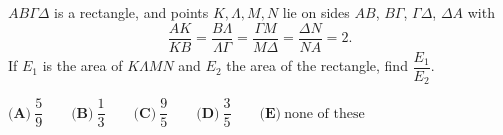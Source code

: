 $AB\Gamma\Delta$ is a rectangle, and points $K,\Lambda,M,N$ lie on sides $AB$, $B\Gamma$, $\Gamma\Delta$, $\Delta A$ with
\[\dfrac{AK}{KB}=\dfrac{B\Lambda}{\Lambda\Gamma}=\dfrac{\Gamma M}{M\Delta}=\dfrac{\Delta N}{NA}=2.\]
If $E_1$ is the area of $K\Lambda MN$ and $E_2$ the area of the rectangle, find $\dfrac{E_1}{E_2}$.

$\textbf{(A)}\ \dfrac{5}{9}\qquad\textbf{(B)}\ \dfrac{1}{3}\qquad\textbf{(C)}\ \dfrac{9}{5}\qquad\textbf{(D)}\ \dfrac{3}{5}\qquad\textbf{(E)}\ \text{none of these}$
